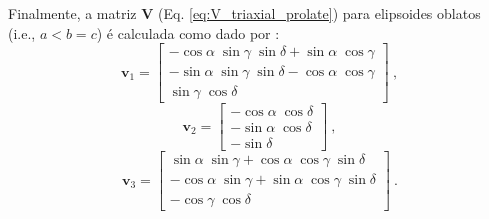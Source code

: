 Finalmente, a matriz $\mathbf{V}$ (Eq. \ref{eq:V_triaxial_prolate}) para elipsoides oblatos (i.e., $a < b = c$) é calculada como dado por \citep{emerson1985}:
\begin{equation}
\mathbf{v}_{1} = \left[\begin{array}{c} 
-\cos\alpha \; \sin\gamma \; \sin\delta + \sin\alpha \; \cos\gamma \\               
-\sin\alpha \; \sin\gamma \; \sin\delta - \cos\alpha \; \cos\gamma \\ 
\sin\gamma \; \cos\delta
\end{array} \right] \: ,
\label{eq:v1_oblate}
\end{equation}
\begin{equation}
\mathbf{v}_{2} = \left[\begin{array}{c} 
-\cos\alpha \; \cos\delta \\
-\sin\alpha \; \cos\delta \\
-\sin\delta
\end{array} \right] \: ,
\label{eq:v2_oblate}
\end{equation}                   
\begin{equation}                    
\mathbf{v}_{3} = \left[\begin{array}{c} 
\sin\alpha \; \sin\gamma + \cos\alpha \; \cos\gamma \; \sin\delta \\                    
-\cos\alpha \; \sin\gamma + \sin\alpha \; \cos\gamma \; \sin\delta \\
-\cos\gamma \; \cos\delta
\end{array} \right] \: .
\label{eq:v3_oblate}
\end{equation}

